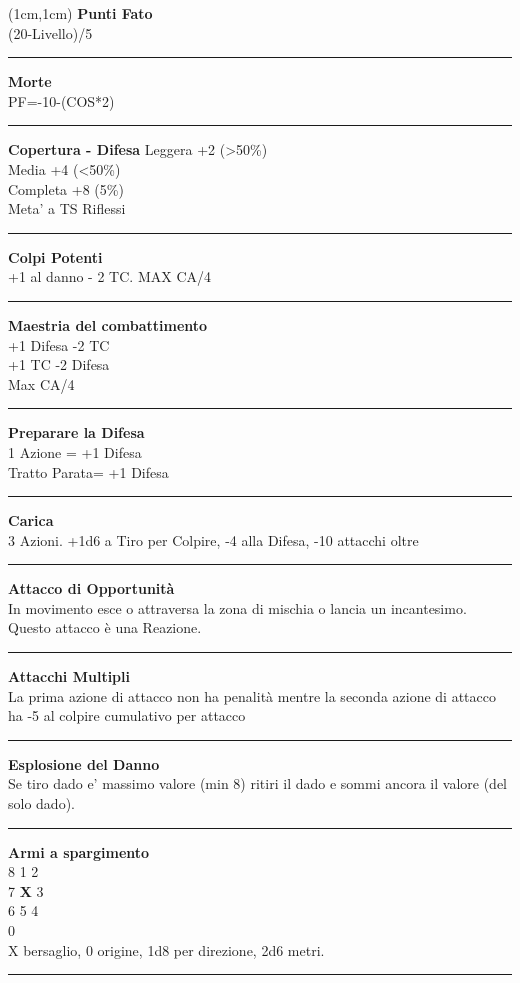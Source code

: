 \documentclass[a4paper,12 pt,openany]{book}
\newcommand{\riga}{\rule{\textwidth}{0.4pt}}
\begin{document}
\begin{textblock*}{4cm}(1cm,1cm) %
{\textbf{Punti Fato}\\
(20-Livello)/5}

\riga

{\textbf{Morte}\\
PF=-10-(COS*2)}

\riga

\textbf{Copertura - Difesa}
Leggera +2 (>50\%)\\
Media +4 (<50\%)\\
Completa +8 (5\%)\\
Meta' a TS Riflessi

\riga

\textbf{Colpi Potenti}\\
+1 al danno - 2 TC. MAX CA/4

\riga

\textbf{Maestria del combattimento}\\
+1 Difesa -2 TC\\
+1 TC -2 Difesa\\
Max CA/4

\riga

\textbf{Preparare la Difesa}\\
1 Azione = +1 Difesa\\
Tratto Parata= +1 Difesa

\riga

\textbf{Carica}\\
3 Azioni. +1d6 a Tiro per Colpire, -4 alla Difesa, -10 attacchi oltre

\riga

\textbf{Attacco di Opportunità}\\
In movimento esce o attraversa la zona di mischia o lancia un incantesimo. Questo attacco è una Reazione.

\riga

\textbf{Attacchi Multipli}\\
La prima azione di attacco non ha penalità mentre la seconda azione di attacco ha -5 al colpire cumulativo per attacco

\riga

\textbf{Esplosione del Danno}\\
Se tiro dado e' massimo valore (min 8) ritiri il dado e sommi ancora il valore (del solo dado).

\riga

\textbf{Armi a spargimento}\\
8 1 2\\
7 \textbf{X} 3\\
6 5 4\\
0\\
X bersaglio, 0 origine, 1d8 per direzione, 2d6 metri.

\riga



\end{textblock*}
\end{document}
